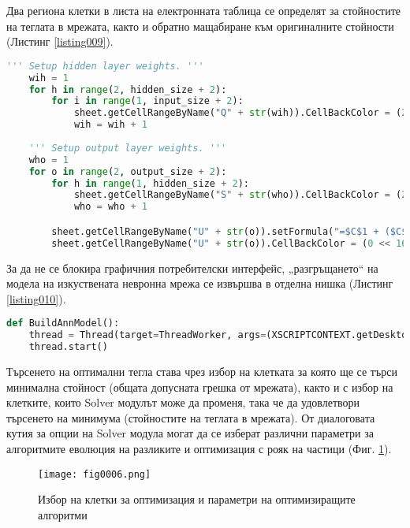 Два региона клетки в листа на електронната таблица се определят за стойностите на теглата в мрежата, както и обратно мащабиране към оригиналните стойности (Листинг \ref{listing009}).

\begin{lstlisting}[caption=Определяне на региони за теглата на мрежата, language=Python, basicstyle=\tiny, label=listing009]
    ''' Setup hidden layer weights. '''
    wih = 1
    for h in range(2, hidden_size + 2):
        for i in range(1, input_size + 2):
            sheet.getCellRangeByName("Q" + str(wih)).CellBackColor = (255 << 16 | 0 << 8 | 255)
            wih = wih + 1
        
    ''' Setup output layer weights. '''
    who = 1
    for o in range(2, output_size + 2):
        for h in range(1, hidden_size + 2):
            sheet.getCellRangeByName("S" + str(who)).CellBackColor = (255 << 16 | 0 << 8 | 255)
            who = who + 1

        sheet.getCellRangeByName("U" + str(o)).setFormula("=$C$1 + ($C$2 - $C$1) * ((T" + str(o) + " - $C$4) / ($C$5 - $C$4))")
        sheet.getCellRangeByName("U" + str(o)).CellBackColor = (0 << 16 | 127 << 8 | 0)
\end{lstlisting}

За да не се блокира графичния потребителски интерфейс, „разгръщането“ на модела на изкуствената невронна мрежа се извършва в отделна нишка (Листинг \ref{listing010}).

\begin{lstlisting}[caption=Изпълнение с отделна нишка, language=Python, basicstyle=\tiny, label=listing010]
def BuildAnnModel():
    thread = Thread(target=ThreadWorker, args=(XSCRIPTCONTEXT.getDesktop(),))
    thread.start()
\end{lstlisting}

Търсенето на оптимални тегла става чрез избор на клетката за която ще се търси минимална стойност (общата допусната грешка от мрежата), както и с избор на клетките, които Solver модулът може да променя, така че да удовлетвори търсенето на минимума (стойностите на теглата в мрежата). От диалоговата кутия за опции на Solver модула могат да се изберат различни параметри за алгоритмите еволюция на разликите и оптимизация с рояк на частици (Фиг. \ref{fig006}).

\begin{figure}[H]
  \centering
  \texttt{[image: fig0006.png]}
  \caption{Избор на клетки за оптимизация и параметри на оптимизиращите алгоритми}
\label{fig006}
\end{figure}

